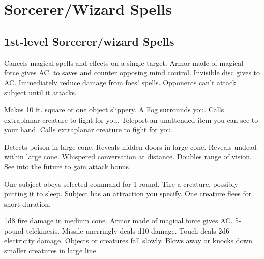 \section{Sorcerer/Wizard Spells}
\subsection{1st-level Sorcerer/wizard Spells}
\begin{swspelllist}
 Cancels magical spells and effects on a single target.
 Armor made of magical force gives  AC.
  to saves and counter opposing mind control.
 Invisible disc gives  to AC.
 Immediately reduce damage from foes' spells.
 Opponents can't attack subject until it attacks.

 Makes 10 ft. square or one object slippery.
 A Fog surrounds you.
 Calls extraplanar creature to fight for you.
 Teleport an unattended item you can see to your hand.
 Calls extraplanar creature to fight for you.

 Detects poison in large cone.
 Reveals hidden doors in large cone.
 Reveals undead within large cone.
 Whispered conversation at distance.
 Doubles range of vision.
 See into the future to gain attack bonus.

 One subject obeys selected command for 1 round.
 Tire a creature, possibly putting it to sleep.
 Subject has an attraction you specify.
 One creature flees for short duration.

 1d8 fire damage in medium cone.
 Armor made of magical force gives  AC.
 5-pound telekinesis.
 Missile unerringly deals d10 damage.
 Touch deals 2d6 electricity damage.
 Objects or creatures fall slowly.
 Blows away or knocks down smaller creatures in large line.


\end{swspelllist}
